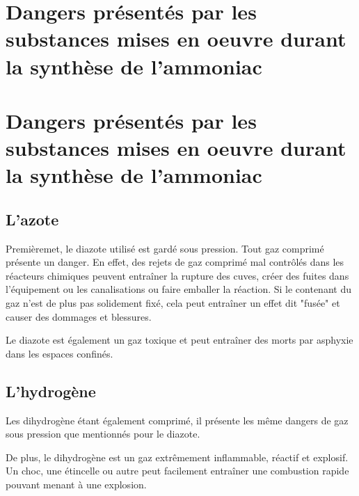 

\section{Dangers présentés par les substances mises en oeuvre durant la synthèse de l'ammoniac}

\section{Dangers présentés par les substances mises en oeuvre durant la synthèse de l'ammoniac}
\subsection{L'azote}
Premièremet, le diazote utilisé est gardé sous pression. Tout gaz comprimé présente un danger. 
En effet, des rejets de gaz comprimé mal contrôlés dans les réacteurs chimiques peuvent entraîner 
la rupture des cuves, créer des fuites dans l'équipement ou les canalisations ou faire emballer la réaction. 
Si le contenant du gaz n'est de plus pas solidement fixé, cela peut entraîner un effet dit "fusée" 
et causer des dommages et blessures.

Le diazote est également un gaz toxique et peut entraîner des morts par asphyxie dans les espaces confinés. 
\subsection{L'hydrogène}
Les dihydrogène étant également comprimé, il présente les même dangers de gaz sous pression que mentionnés pour le diazote.

De plus, le dihydrogène est un gaz extrêmement inflammable, réactif et explosif. Un choc, une étincelle ou autre peut facilement 
entraîner une combustion rapide pouvant menant à une explosion.

